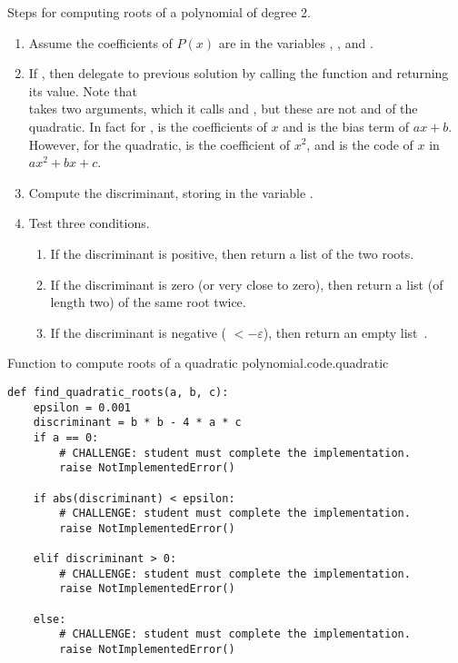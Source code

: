 Steps for computing roots of a polynomial of degree 2.
\begin{enumerate}
\item Assume the coefficients of $P(x)$ are in the variables , , and .
\item If , then delegate to previous solution by calling the function  and returning its value.  Note that \\
   takes two arguments, which it calls  and , but these are not  and  of the quadratic.   In fact for ,  is the coefficients of $x$ and  is the bias term of $a x + b$.  However, for the quadratic,  is the coefficient of $x^2$, and  is the code of $x$ in $a x^2 + b x + c$.
\item Compute the discriminant, storing in the variable .
\item Test three conditions.
  \begin{enumerate}
  \item If the discriminant is positive, then return a list of the two roots.
  \item If the discriminant is zero (or very close to zero), then return a list (of length two) of the same root twice.
  \item If the discriminant is negative ( $< -\varepsilon$), then return an empty list~\code{[]}.
  \end{enumerate}
\end{enumerate}


\begin{listing}{Function to compute roots of a quadratic polynomial.}{code.quadratic}
\begin{minipage}[c]{0.95\textwidth}\begin{lstlisting}
def find_quadratic_roots(a, b, c):
    epsilon = 0.001
    discriminant = b * b - 4 * a * c
    if a == 0:
        # CHALLENGE: student must complete the implementation.
        raise NotImplementedError()

    if abs(discriminant) < epsilon:
        # CHALLENGE: student must complete the implementation.
        raise NotImplementedError()

    elif discriminant > 0:
        # CHALLENGE: student must complete the implementation.
        raise NotImplementedError()

    else:
        # CHALLENGE: student must complete the implementation.
        raise NotImplementedError()

\end{lstlisting}\end{minipage}\end{listing}

